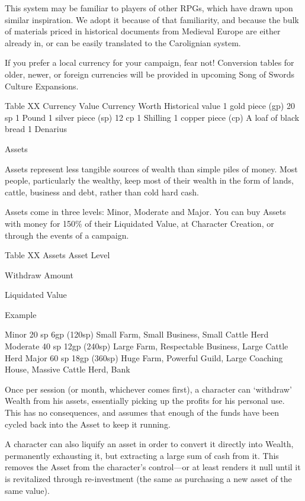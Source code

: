 \documentclass[oneside,11pt,english]{book}
\begin{document}
This system may be familiar to players of other RPGs, which have drawn upon similar inspiration. We adopt it because of that familiarity, and because the bulk of materials priced in historical documents from Medieval Europe are either already in, or can be easily translated to the Carolignian system.


If you prefer a local currency for your campaign, fear not! Conversion tables for older, newer, or foreign currencies will be provided in upcoming Song of Swords Culture Expansions.


Table XX Currency Value 
Currency Worth Historical value 
1 gold piece (gp) 20 sp 1 Pound 
1 silver piece (sp) 12 cp 1 Shilling 
1 copper piece (cp) A loaf of black bread 1 Denarius 

 

Assets 

 
Assets represent less tangible sources of wealth than simple piles of money. Most people, particularly the 
wealthy, keep most of their wealth in the form of lands, cattle, business and debt, rather than cold hard 
cash. 

 


Assets come in three levels: Minor, Moderate and Major. You can buy Assets with money for 150\% of 
their Liquidated Value, at Character Creation, or through the events of a campaign. 

 
Table XX Assets 
Asset 
Level 

Withdraw 
Amount 

Liquidated 
Value 

Example 

Minor 20 sp 6gp (120sp) Small Farm, Small Business, Small Cattle Herd 
Moderate 40 sp 12gp (240sp) Large Farm, Respectable Business, Large Cattle Herd 
Major 60 sp 18gp (360sp) Huge Farm, Powerful Guild, Large Coaching House, Massive 
Cattle Herd, Bank 

 

Once per session (or month, whichever comes first), a character can ‘withdraw’ Wealth from his assets, 
essentially picking up the profits for his personal use. This has no consequences, and assumes that enough 
of the funds have been cycled back into the Asset to keep it running. 

 

A character can also liquify an asset in order to convert it directly into Wealth, permanently exhausting it, 
but extracting a large sum of cash from it. This removes the Asset from the character’s control—or at 
least renders it null until it is revitalized through re-investment (the same as purchasing a new asset of the 
same value). 
\end{document}
